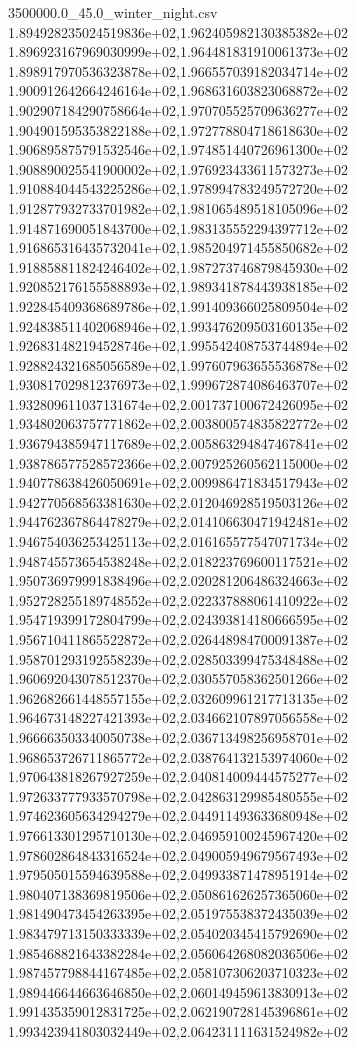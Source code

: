 \begin{filecontents*}{3500000.0_45.0_winter_night.csv}
1.894928235024519836e+02,1.962405982130385382e+02
1.896923167969030999e+02,1.964481831910061373e+02
1.898917970536323878e+02,1.966557039182034714e+02
1.900912642664246164e+02,1.968631603823068872e+02
1.902907184290758664e+02,1.970705525709636277e+02
1.904901595353822188e+02,1.972778804718618630e+02
1.906895875791532546e+02,1.974851440726961300e+02
1.908890025541900002e+02,1.976923433611573273e+02
1.910884044543225286e+02,1.978994783249572720e+02
1.912877932733701982e+02,1.981065489518105096e+02
1.914871690051843700e+02,1.983135552294397712e+02
1.916865316435732041e+02,1.985204971455850682e+02
1.918858811824246402e+02,1.987273746879845930e+02
1.920852176155588893e+02,1.989341878443938185e+02
1.922845409368689786e+02,1.991409366025809504e+02
1.924838511402068946e+02,1.993476209503160135e+02
1.926831482194528746e+02,1.995542408753744894e+02
1.928824321685056589e+02,1.997607963655536878e+02
1.930817029812376973e+02,1.999672874086463707e+02
1.932809611037131674e+02,2.001737100672426095e+02
1.934802063757771862e+02,2.003800574835822772e+02
1.936794385947117689e+02,2.005863294847467841e+02
1.938786577528572366e+02,2.007925260562115000e+02
1.940778638426050691e+02,2.009986471834517943e+02
1.942770568563381630e+02,2.012046928519503126e+02
1.944762367864478279e+02,2.014106630471942481e+02
1.946754036253425113e+02,2.016165577547071734e+02
1.948745573654538248e+02,2.018223769600117521e+02
1.950736979991838496e+02,2.020281206486324663e+02
1.952728255189748552e+02,2.022337888061410922e+02
1.954719399172804799e+02,2.024393814180666595e+02
1.956710411865522872e+02,2.026448984700091387e+02
1.958701293192558239e+02,2.028503399475348488e+02
1.960692043078512370e+02,2.030557058362501266e+02
1.962682661448557155e+02,2.032609961217713135e+02
1.964673148227421393e+02,2.034662107897056558e+02
1.966663503340050738e+02,2.036713498256958701e+02
1.968653726711865772e+02,2.038764132153974060e+02
1.970643818267927259e+02,2.040814009444575277e+02
1.972633777933570798e+02,2.042863129985480555e+02
1.974623605634294279e+02,2.044911493633680948e+02
1.976613301295710130e+02,2.046959100245967420e+02
1.978602864843316524e+02,2.049005949679567493e+02
1.979505015594639588e+02,2.049933871478951914e+02
1.980407138369819506e+02,2.050861626257365060e+02
1.981490473454263395e+02,2.051975538372435039e+02
1.983479713150333339e+02,2.054020345415792690e+02
1.985468821643382284e+02,2.056064268082036506e+02
1.987457798844167485e+02,2.058107306203710323e+02
1.989446644663646850e+02,2.060149459613830913e+02
1.991435359012831725e+02,2.062190728145396861e+02
1.993423941803032449e+02,2.064231111631524982e+02

\end{filecontents*}
